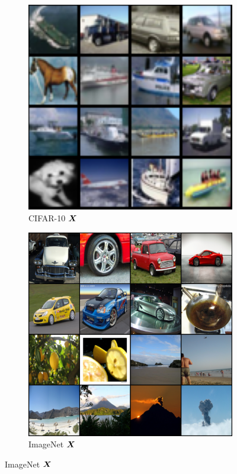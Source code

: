 \documentclass[../../book-main.tex]{subfiles}
\begin{document}
\begin{figure}[t]
\begin{subfigure}[t]{0.3\textwidth}
        \includegraphics[width=\textwidth]{figs_chap6/cifar_input.png}
        \caption{{\small CIFAR-10 $\bm{X}$}}
    \end{subfigure}
    \hfill
    \begin{subfigure}[t]{0.3\textwidth}
        \centering
        \includegraphics[width=\textwidth]{figs_chap6/Imagenet_input.png}
        \caption{{\small ImageNet $\bm{X}$}}
    \end{subfigure}


\end{figure}
\end{document}
